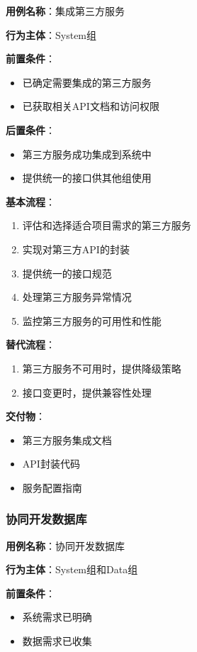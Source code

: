 \documentclass[a4paper,12pt]{article}
\begin{document}
\textbf{用例名称}：集成第三方服务

\textbf{行为主体}：System组

\textbf{前置条件}：
\begin{itemize}
  \item 已确定需要集成的第三方服务
  \item 已获取相关API文档和访问权限
\end{itemize}

\textbf{后置条件}：
\begin{itemize}
  \item 第三方服务成功集成到系统中
  \item 提供统一的接口供其他组使用
\end{itemize}

\textbf{基本流程}：
\begin{enumerate}
  \item 评估和选择适合项目需求的第三方服务
  \item 实现对第三方API的封装
  \item 提供统一的接口规范
  \item 处理第三方服务异常情况
  \item 监控第三方服务的可用性和性能
\end{enumerate}

\textbf{替代流程}：
\begin{enumerate}
  \item 第三方服务不可用时，提供降级策略
  \item 接口变更时，提供兼容性处理
\end{enumerate}

\textbf{交付物}：
\begin{itemize}
  \item 第三方服务集成文档
  \item API封装代码
  \item 服务配置指南
\end{itemize}

\subsubsection{协同开发数据库}

\textbf{用例名称}：协同开发数据库

\textbf{行为主体}：System组和Data组

\textbf{前置条件}：
\begin{itemize}
  \item 系统需求已明确
  \item 数据需求已收集
\end{itemize}
\end{document}
